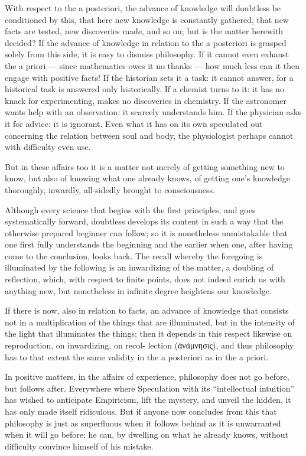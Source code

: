 \documentclass[12pt]{book}
\begin{document}
With respect to the a posteriori, the advance of knowledge will doubtless be conditioned by
this, that here new knowledge is constantly gathered, that new facts are tested, new
discoveries made, and so on; but is the matter herewith decided?
If the advance of knowledge in relation to the a posteriori is grasped solely from this side,
it is easy to dismiss philosophy. If it cannot even exhaust the a priori — since mathematics
owes it no thanks — how much less can it then engage with positive facts! If the historian
sets it a task: it cannot answer, for a historical task is answered only historically. If a
chemist turns to it: it has no knack for experimenting, makes no discoveries in chemistry. If
the astronomer wants help with an observation: it scarcely understands him. If the physician
asks it for advice: it is ignorant. Even what it has on its own speculated out concerning the
relation between soul and body, the physiologist perhaps cannot with difficulty even use.

But in these affairs too it is a matter not merely of getting something new to know, but also
of knowing what one already knows, of getting one's knowledge thoroughly, inwardly,
all-sidedly brought to consciousness.

Although every science that begins with the first principles, and goes systematically forward,
doubtless develops its content in such a way that the otherwise prepared beginner can follow;
so it is nonetheless unmistakable that one first fully understands the beginning and the
earlier when one, after having come to the conclusion, looks back. The recall whereby the
foregoing is illuminated by the following is an inwardizing of the matter, a doubling of
reflection, which, with respect to finite points, does not indeed enrich us with anything new,
but nonetheless in infinite degree heightens our knowledge.

If there is now, also in relation to facts, an advance of knowledge that consists not in a
multiplication of the things that are illuminated, but in the intensity of the light that
illuminates the things; then it depends in this respect likewise on reproduction, on
inwardizing, on recol-
lection (ἀνάμνησις), and thus philosophy has to that extent the same validity in the a
posteriori as in the a priori.

In positive matters, in the affairs of experience, philosophy does not go before, but follows
after. Everywhere where Speculation with its ``intellectual intuition'' has wished to
anticipate Empiricism, lift the mystery, and unveil the hidden, it has only made itself
ridiculous. But if anyone now concludes from this that philosophy is just as superfluous when
it follows behind as it is unwarranted when it will go before; he can, by dwelling on what he
already knows, without difficulty convince himself of his mistake.
\end{document}
